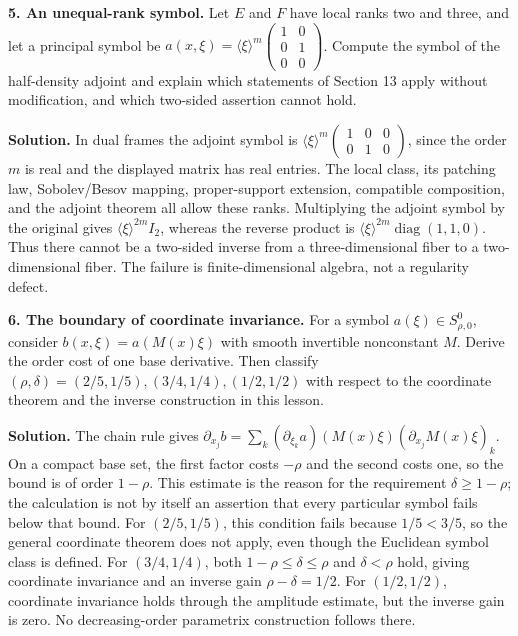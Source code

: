 \documentclass[
  11pt,
]{article}
\begin{document}
\textbf{5. An unequal-rank symbol.} Let \(E\) and \(F\) have local ranks
two and three, and let a principal symbol be
\(a(x,\xi)=\langle\xi\rangle^m\begin{pmatrix}1&0\\0&1\\0&0\end{pmatrix}\).
Compute the symbol of the half-density adjoint and explain which
statements of Section 13 apply without modification, and which two-sided
assertion cannot hold.

\textbf{Solution.} In dual frames the adjoint symbol is
\(\langle\xi\rangle^m\begin{pmatrix}1&0&0\\0&1&0\end{pmatrix}\), since
the order \(m\) is real and the displayed matrix has real entries. The
local class, its patching law, Sobolev/Besov mapping, proper-support
extension, compatible composition, and the adjoint theorem all allow
these ranks. Multiplying the adjoint symbol by the original gives
\(\langle\xi\rangle^{2m}I_2\), whereas the reverse product is
\(\langle\xi\rangle^{2m}\operatorname{diag}(1,1,0)\). Thus there cannot
be a two-sided inverse from a three-dimensional fiber to a
two-dimensional fiber. The failure is finite-dimensional algebra, not a
regularity defect.

\textbf{6. The boundary of coordinate invariance.} For a symbol
\(a(\xi)\in S^0_{\rho,0}\), consider \(b(x,\xi)=a(M(x)\xi)\) with smooth
invertible nonconstant \(M\). Derive the order cost of one base
derivative. Then classify
\((\rho,\delta)=(2/5,1/5),(3/4,1/4),(1/2,1/2)\) with respect to the
coordinate theorem and the inverse construction in this lesson.

\textbf{Solution.} The chain rule gives
\(\partial_{x_j}b=\sum_k(\partial_{\xi_k}a)(M(x)\xi)(\partial_{x_j}M(x)\xi)_k\).
On a compact base set, the first factor costs \(-\rho\) and the second
costs one, so the bound is of order \(1-\rho\). This estimate is the
reason for the requirement \(\delta\geq1-\rho\); the calculation is not
by itself an assertion that every particular symbol fails below that
bound. For \((2/5,1/5)\), this condition fails because \(1/5<3/5\), so
the general coordinate theorem does not apply, even though the Euclidean
symbol class is defined. For \((3/4,1/4)\), both
\(1-\rho\leq\delta\leq\rho\) and \(\delta<\rho\) hold, giving coordinate
invariance and an inverse gain \(\rho-\delta=1/2\). For \((1/2,1/2)\),
coordinate invariance holds through the amplitude estimate, but the
inverse gain is zero. No decreasing-order parametrix construction
follows there.
\end{document}
